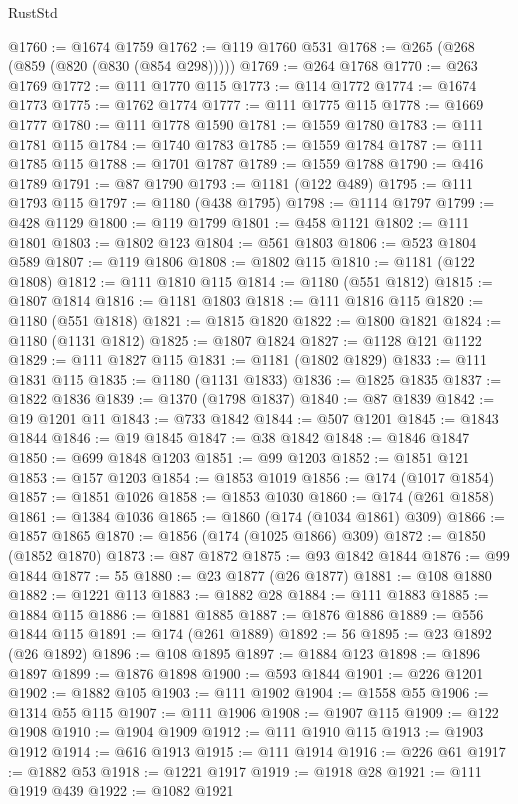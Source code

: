 \begin{lexlean}{RustStd}
\begin{coremodule}
@1760 := @1674 @1759
@1762 := @119 @1760 @531
@1768 := @265 (@268 (@859 (@820 (@830 (@854 @298)))))
@1769 := @264 @1768
@1770 := @263 @1769
@1772 := @111 @1770 @115
@1773 := @114 @1772
@1774 := @1674 @1773
@1775 := @1762 @1774
@1777 := @111 @1775 @115
@1778 := @1669 @1777
@1780 := @111 @1778 @1590
@1781 := @1559 @1780
@1783 := @111 @1781 @115
@1784 := @1740 @1783
@1785 := @1559 @1784
@1787 := @111 @1785 @115
@1788 := @1701 @1787
@1789 := @1559 @1788
@1790 := @416 @1789
@1791 := @87 @1790
@1793 := @1181 (@122 @489)
@1795 := @111 @1793 @115
@1797 := @1180 (@438 @1795)
@1798 := @1114 @1797
@1799 := @428 @1129
@1800 := @119 @1799
@1801 := @458 @1121
@1802 := @111 @1801
@1803 := @1802 @123
@1804 := @561 @1803
@1806 := @523 @1804 @589
@1807 := @119 @1806
@1808 := @1802 @115
@1810 := @1181 (@122 @1808)
@1812 := @111 @1810 @115
@1814 := @1180 (@551 @1812)
@1815 := @1807 @1814
@1816 := @1181 @1803
@1818 := @111 @1816 @115
@1820 := @1180 (@551 @1818)
@1821 := @1815 @1820
@1822 := @1800 @1821
@1824 := @1180 (@1131 @1812)
@1825 := @1807 @1824
@1827 := @1128 @121 @1122
@1829 := @111 @1827 @115
@1831 := @1181 (@1802 @1829)
@1833 := @111 @1831 @115
@1835 := @1180 (@1131 @1833)
@1836 := @1825 @1835
@1837 := @1822 @1836
@1839 := @1370 (@1798 @1837)
@1840 := @87 @1839
@1842 := @19 @1201 @11
@1843 := @733 @1842
@1844 := @507 @1201
@1845 := @1843 @1844
@1846 := @19 @1845
@1847 := @38 @1842
@1848 := @1846 @1847
@1850 := @699 @1848 @1203
@1851 := @99 @1203
@1852 := @1851 @121
@1853 := @157 @1203
@1854 := @1853 @1019
@1856 := @174 (@1017 @1854)
@1857 := @1851 @1026
@1858 := @1853 @1030
@1860 := @174 (@261 @1858)
@1861 := @1384 @1036
@1865 := @1860 (@174 (@1034 @1861) @309)
@1866 := @1857 @1865
@1870 := @1856 (@174 (@1025 @1866) @309)
@1872 := @1850 (@1852 @1870)
@1873 := @87 @1872
@1875 := @93 @1842 @1844
@1876 := @99 @1844
@1877 := 55
@1880 := @23 @1877 (@26 @1877)
@1881 := @108 @1880
@1882 := @1221 @113
@1883 := @1882 @28
@1884 := @111 @1883
@1885 := @1884 @115
@1886 := @1881 @1885
@1887 := @1876 @1886
@1889 := @556 @1844 @115
@1891 := @174 (@261 @1889)
@1892 := 56
@1895 := @23 @1892 (@26 @1892)
@1896 := @108 @1895
@1897 := @1884 @123
@1898 := @1896 @1897
@1899 := @1876 @1898
@1900 := @593 @1844
@1901 := @226 @1201
@1902 := @1882 @105
@1903 := @111 @1902
@1904 := @1558 @55
@1906 := @1314 @55 @115
@1907 := @111 @1906
@1908 := @1907 @115
@1909 := @122 @1908
@1910 := @1904 @1909
@1912 := @111 @1910 @115
@1913 := @1903 @1912
@1914 := @616 @1913
@1915 := @111 @1914
@1916 := @226 @61
@1917 := @1882 @53
@1918 := @1221 @1917
@1919 := @1918 @28
@1921 := @111 @1919 @439
@1922 := @1082 @1921

\end{coremodule}
\end{lexlean}

